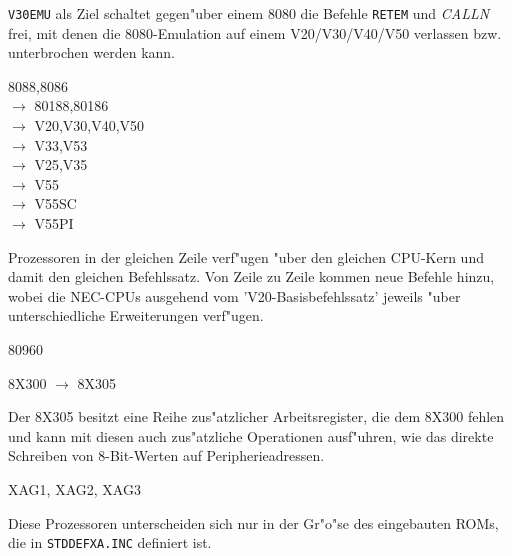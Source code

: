 \documentclass[12pt,a4paper,twoside]{report}
\newcommand{\tty}[1]{{\tt #1}}
\begin{document}
{\tt V30EMU} als Ziel schaltet gegen"uber einem 8080 die Befehle {\tt RETEM}
und {\em CALLN} frei, mit denen die 8080-Emulation auf einem V20/V30/V40/V50
verlassen bzw. unterbrochen werden kann.
\begin{cpulist}
   8088,8086 \\
\> $\rightarrow$ 80188,80186 \\
\> $\rightarrow$ V20,V30,V40,V50 \\
\> $\rightarrow$ V33,V53 \\
\> $\rightarrow$ V25,V35 \\
\> $\rightarrow$ V55 \\
\> $\rightarrow$ V55SC \\
\> $\rightarrow$ V55PI
\end{cpulist}
Prozessoren in der gleichen Zeile verf"ugen "uber den gleichen CPU-Kern und
damit den gleichen Befehlssatz.  Von Zeile zu Zeile kommen neue Befehle
hinzu, wobei die NEC-CPUs ausgehend vom 'V20-Basisbefehlssatz' jeweils "uber
unterschiedliche Erweiterungen verf"ugen.
\begin{cpulist}
   80960
\end{cpulist}
\begin{cpulist}
   8X300 $\rightarrow$ 8X305
\end{cpulist}
Der 8X305 besitzt eine Reihe zus"atzlicher Arbeitsregister, die dem
8X300 fehlen und kann mit diesen auch zus"atzliche Operationen ausf"uhren,
wie das direkte Schreiben von 8-Bit-Werten auf Peripherieadressen.
\begin{cpulist}
   XAG1, XAG2, XAG3
\end{cpulist}
Diese Prozessoren unterscheiden sich nur in der Gr"o"se des eingebauten
ROMs, die in \tty{STDDEFXA.INC} definiert ist.
\end{document}
